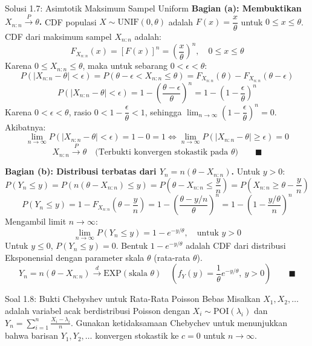 \documentclass[10pt,twoside]{article}
\begin{document}
\begin{solbox}{Solusi 1.7: Asimtotik Maksimum Sampel Uniform}
\textbf{Bagian (a): Membuktikan $X_{n:n} \xrightarrow{P} \theta$.}
CDF populasi $X \sim \text{UNIF}(0, \theta)$ adalah $F(x) = \dfrac{x}{\theta}$ untuk $0 \le x \le \theta$.
CDF dari maksimum sampel $X_{n:n}$ adalah:
\[
F_{X_{n:n}}(x) = [F(x)]^n = \left(\frac{x}{\theta}\right)^n, \quad 0 \le x \le \theta
\]
Karena $0 \le X_{n:n} \le \theta$, maka untuk sebarang $0 < \epsilon < \theta$:
\[
P(|X_{n:n} - \theta| < \epsilon) = P(\theta - \epsilon < X_{n:n} \le \theta) = F_{X_{n:n}}(\theta) - F_{X_{n:n}}(\theta - \epsilon)
\]
\[
P(|X_{n:n} - \theta| < \epsilon) = 1 - \left(\frac{\theta - \epsilon}{\theta}\right)^n = 1 - \left(1 - \frac{\epsilon}{\theta}\right)^n
\]
Karena $0 < \epsilon < \theta$, rasio $0 < 1 - \dfrac{\epsilon}{\theta} < 1$, sehingga $\lim_{n \to \infty} \left(1 - \dfrac{\epsilon}{\theta}\right)^n = 0$.
Akibatnya:
\[
\lim_{n \to \infty} P(|X_{n:n} - \theta| < \epsilon) = 1 - 0 = 1 \iff \lim_{n \to \infty} P(|X_{n:n} - \theta| \ge \epsilon) = 0
\]
\[
\boxed{X_{n:n} \xrightarrow{P} \theta \quad \text{(Terbukti konvergen stokastik pada } \theta\text{)}} \qquad \blacksquare
\]

\textbf{Bagian (b): Distribusi terbatas dari $Y_n = n(\theta - X_{n:n})$.}
Untuk $y > 0$:
\[
P(Y_n \le y) = P\left(n(\theta - X_{n:n}) \le y\right) = P\left(\theta - X_{n:n} \le \frac{y}{n}\right) = P\left(X_{n:n} \ge \theta - \frac{y}{n}\right)
\]
\[
P(Y_n \le y) = 1 - F_{X_{n:n}}\left(\theta - \frac{y}{n}\right) = 1 - \left(\frac{\theta - y/n}{\theta}\right)^n = 1 - \left(1 - \frac{y/\theta}{n}\right)^n
\]
Mengambil limit $n \to \infty$:
\[
\lim_{n \to \infty} P(Y_n \le y) = 1 - e^{-y/\theta}, \quad \text{untuk } y > 0
\]
Untuk $y \le 0$, $P(Y_n \le y) = 0$.
Bentuk $1 - e^{-y/\theta}$ adalah CDF dari distribusi Eksponensial dengan parameter skala $\theta$ (rata-rata $\theta$).
\[
\boxed{Y_n = n(\theta - X_{n:n}) \xrightarrow{d} \text{EXP}(\text{skala } \theta) \quad \left(f_Y(y) = \frac{1}{\theta} e^{-y/\theta}, \ y > 0\right)} \qquad \blacksquare
\]
\end{solbox}

\begin{soalbox}{Soal 1.8: Bukti Chebyshev untuk Rata-Rata Poisson Bebas}
Misalkan $X_1, X_2, \dots$ adalah variabel acak berdistribusi Poisson dengan $X_i \sim \text{POI}(\lambda_i)$ dan $Y_n = \sum_{i=1}^{n}\frac{X_i - \lambda_i}{n}$. Gunakan ketidaksamaan Chebychev untuk menunjukkan bahwa barisan $Y_1, Y_2, \dots$ konvergen stokastik ke $c = 0$ untuk $n \to \infty$.
\end{soalbox}
\end{document}
